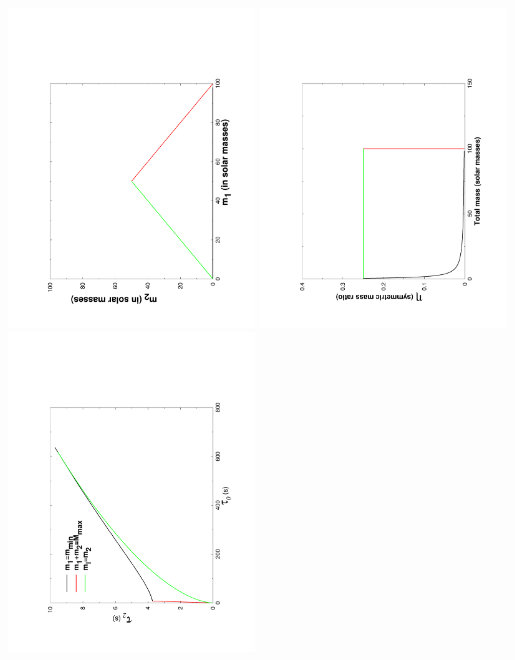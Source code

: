 \documentclass{minimal}
\begin{document}
\vspace*{-0.5cm}
\begin{center}
\includegraphics[angle=-90,width=0.49\textwidth]{./LALInspiralBankHm1m2}
\includegraphics[angle=-90,width=0.49\textwidth]{./LALInspiralBankHtotalMassEta}\\
\includegraphics[angle=-90,width=0.49\textwidth]{./LALInspiralBankHt0t2}

\end{center}
\end{document}
